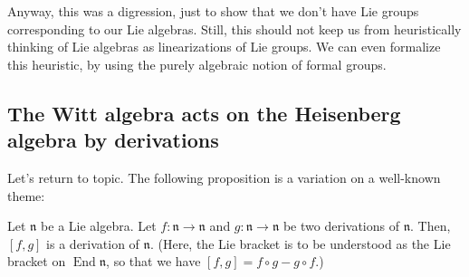 \documentclass[etingof-lie.tex]{subfiles}
\begin{document}
Anyway, this was a digression, just to show that we don't have Lie groups
corresponding to our Lie algebras. Still, this should not keep us from
heuristically thinking of Lie algebras as linearizations of Lie groups. We can
even formalize this heuristic, by using the purely algebraic notion of formal groups.

\subsection{The Witt algebra acts on the Heisenberg algebra by derivations}

Let's return to topic. The following proposition is a variation on a
well-known theme:

\begin{proposition}
\label{prop.commutator.derivs}Let $\mathfrak{n}$ be a Lie algebra. Let
$f:\mathfrak{n}\rightarrow\mathfrak{n}$ and $g:\mathfrak{n}\rightarrow
\mathfrak{n}$ be two derivations of $\mathfrak{n}$. Then, $\left[  f,g\right]
$ is a derivation of $\mathfrak{n}$. (Here, the Lie bracket is to be
understood as the Lie bracket on $\operatorname*{End}\mathfrak{n}$, so that we
have $\left[  f,g\right]  =f\circ g-g\circ f$.)
\end{proposition}
\end{document}
